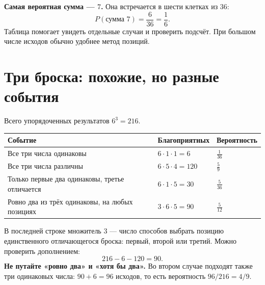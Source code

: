 \documentclass[a4paper,12pt]{article}
\newcommand{\key}[1]{\textcolor{darkaccent}{\textbf{#1}}}
\newcommand{\sect}[1]{\section{#1}\vspace{-3pt}}
\begin{document}
\key{Самая вероятная сумма --- $7$.} Она встречается в шести клетках из $36$:
\[
P(\text{сумма }7)=\frac{6}{36}=\frac16.
\]
Таблица помогает увидеть отдельные случаи и проверить подсчёт. При большом числе исходов обычно удобнее метод позиций.

\sect{Три броска: похожие, но разные события}
Всего упорядоченных результатов $6^3=216$.

\renewcommand{\arraystretch}{1.35}
\begin{center}
\small
\begin{tabularx}{\linewidth}{@{}X>{\raggedleft\arraybackslash}p{34mm}>{\raggedleft\arraybackslash}p{22mm}@{}}
\toprule
Событие & Благоприятных & Вероятность\\
\midrule
Все три числа одинаковы & $6\cdot1\cdot1=6$ & $\frac{1}{36}$\\
Все три числа различны & $6\cdot5\cdot4=120$ & $\frac{5}{9}$\\
Только первые два одинаковы, третье отличается & $6\cdot1\cdot5=30$ & $\frac{5}{36}$\\
Ровно два из трёх одинаковы, на любых позициях & $3\cdot6\cdot5=90$ & $\frac{5}{12}$\\
\bottomrule
\end{tabularx}
\end{center}

В последней строке множитель $3$ --- число способов выбрать позицию единственного отличающегося броска: первый, второй или третий. Можно проверить дополнением:
\[
216-6-120=90.
\]
\key{Не путайте «ровно два» и «хотя бы два».} Во втором случае подходят также три одинаковых числа: $90+6=96$ исходов, то есть вероятность $96/216=4/9$.
\end{document}
